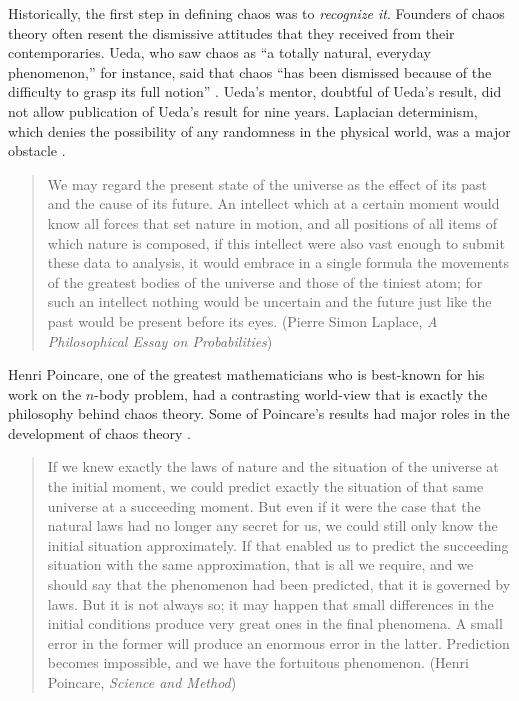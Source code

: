 \documentclass[10pt,twoside]{book}
\begin{document}
Historically, the first step in defining chaos was to \textit{recognize it}.
Founders of chaos theory often resent the dismissive attitudes that they received from their contemporaries.
Ueda, who saw chaos as ``a totally natural, everyday phenomenon,'' for instance, said that chaos ``has been dismissed because of the difficulty to grasp its full notion'' \citep[p533]{gleick}.
Ueda's mentor, doubtful of Ueda's result, did not allow publication of Ueda's result for nine years.
Laplacian determinism, which denies the possibility of any randomness in the physical world, was a major obstacle \citep{stone}.
\begin{quotation}
  We may regard the present state of the universe as the effect of its past and the cause of its future. An intellect which at a certain moment would know all forces that set nature in motion, and all positions of all items of which nature is composed, if this intellect were also vast enough to submit these data to analysis, it would embrace in a single formula the movements of the greatest bodies of the universe and those of the tiniest atom; for such an intellect nothing would be uncertain and the future just like the past would be present before its eyes.
  (Pierre Simon Laplace, \textit{A Philosophical Essay on Probabilities})
\end{quotation}
Henri Poincare, one of the greatest mathematicians who is best-known for his work on the $n$-body problem, had a contrasting world-view that is exactly the philosophy behind chaos theory.
Some of Poincare's results had major roles in the development of chaos theory \citep[p.202]{ueda-abraham}.
\begin{quotation}
  If we knew exactly the laws of nature and the situation of the universe at the initial moment, we could predict exactly the situation of that same universe at a succeeding moment. But even if it were the case that the natural laws had no longer any secret for us, we could still only know the initial situation approximately. If that enabled us to predict the succeeding situation with the same approximation, that is all we require, and we should say that the phenomenon had been predicted, that it is governed by laws. But it is not always so; it may happen that small differences in the initial conditions produce very great ones in the final phenomena. A small error in the former will produce an enormous error in the latter. Prediction becomes impossible, and we have the fortuitous phenomenon.
  (Henri Poincare, \textit{Science and Method})
\end{quotation}
\end{document}

